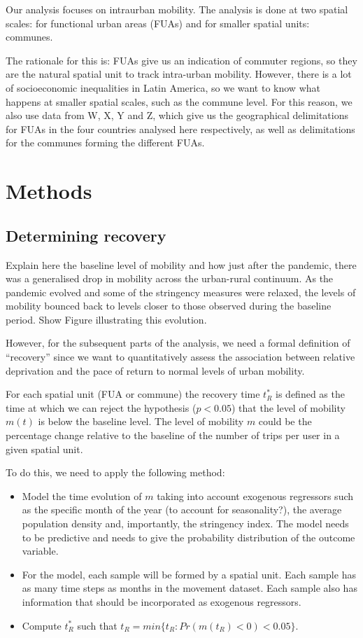 \documentclass[11pt,letterpaper]{article}
\begin{document}
Our analysis focuses on intraurban mobility. The analysis is done at two
spatial scales: for functional urban areas (FUAs) and for smaller
spatial units: communes.

The rationale for this is: FUAs give us an indication of commuter
regions, so they are the natural spatial unit to track intra-urban
mobility. However, there is a lot of socioeconomic inequalities in Latin
America, so we want to know what happens at smaller spatial scales, such
as the commune level. For this reason, we also use data from W, X, Y and
Z, which give us the geographical delimitations for FUAs in the four
countries analysed here respectively, as well as delimitations for the
communes forming the different FUAs.

\section{Methods}

\subsection{Determining recovery}

Explain here the baseline level of mobility and how just after the
pandemic, there was a generalised drop in mobility across the
urban-rural continuum. As the pandemic evolved and some of the
stringency measures were relaxed, the levels of mobility bounced back to
levels closer to those observed during the baseline period. Show Figure
illustrating this evolution.

However, for the subsequent parts of the analysis, we need a formal
definition of ``recovery'' since we want to quantitatively assess the
association between relative deprivation and the pace of return to
normal levels of urban mobility.

For each spatial unit (FUA or commune) the recovery time \(t_R^*\) is
defined as the time at which we can reject the hypothesis (\(p<0.05\))
that the level of mobility \(m(t)\) is below the baseline level. The
level of mobility \(m\) could be the percentage change relative to the
baseline of the number of trips per user in a given spatial unit.

To do this, we need to apply the following method:

\begin{itemize}

\item Model the time evolution of $m$ taking into account exogenous regressors such as the specific month of the year (to account for seasonality?), the average population density and, importantly, the stringency index. The model needs to be predictive and needs to give the probability distribution of the outcome variable.
\item For the model, each sample will be formed by a spatial unit. Each sample has as many time steps as months in the movement dataset. Each sample also has information that should be incorporated as exogenous regressors.
\item Compute $t_R^*$ such that $ t_R = min\{t_R: Pr(m(t_R)<0) < 0.05\}$.
\end{itemize}
\end{document}
